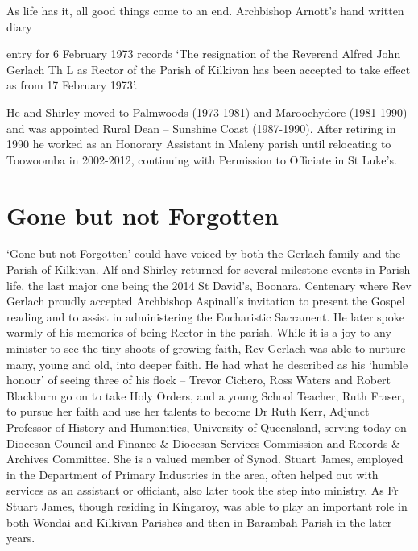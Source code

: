 As life has it, all good things come to an end. Archbishop Arnott's hand written diary



entry for 6 February 1973 records `The resignation of the Reverend Alfred John Gerlach Th L as Rector of the Parish of Kilkivan has been accepted to take effect as from 17 February 1973'.



He and Shirley moved to Palmwoods (1973-1981) and Maroochydore (1981-1990) and was appointed Rural Dean -- Sunshine Coast (1987-1990). After retiring in 1990 he worked as an Honorary Assistant in Maleny parish until relocating to Toowoomba in 2002-2012, continuing with Permission to Officiate in St Luke's.



\section{Gone but not Forgotten}



`Gone but not Forgotten' could have voiced by both the Gerlach family and the Parish of Kilkivan. Alf and Shirley returned for several milestone events in Parish life, the last major one being the 2014 St David's, Boonara, Centenary where Rev Gerlach proudly accepted Archbishop Aspinall's invitation to present the Gospel reading and to assist in administering the Eucharistic Sacrament. He later spoke warmly of his memories of being Rector in the parish. While it is a joy to any minister to see the tiny shoots of growing faith, Rev Gerlach was able to nurture many, young and old, into deeper faith. He had what he described as his `humble honour' of seeing three of his flock -- Trevor Cichero, Ross Waters and Robert Blackburn go on to take Holy Orders, and a young School Teacher, Ruth Fraser, to pursue her faith and use her talents to become Dr Ruth Kerr, Adjunct Professor of History and Humanities, University of Queensland, serving today on Diocesan Council and Finance \& Diocesan Services Commission and Records \& Archives Committee. She is a valued member of Synod. Stuart James, employed in the Department of Primary Industries in the area, often helped out with services as an assistant or officiant, also later took the step into ministry. As Fr Stuart James, though residing in Kingaroy, was able to play an important role in both Wondai and Kilkivan Parishes and then in Barambah Parish in the later years.



